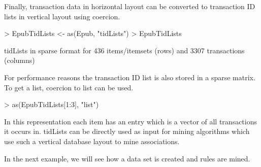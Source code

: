 \documentclass[10pt,a4paper]{article}
\newcommand{\class}[1]{\mbox{\textsf{#1}}}
\begin{document}
Finally, transaction data in horizontal layout can be converted to
transaction ID lists in vertical layout using coercion.

\begin{Schunk}
\begin{Sinput}
> EpubTidLists <- as(Epub, "tidLists")
> EpubTidLists
\end{Sinput}
\begin{Soutput}
tidLists in sparse format for
 436 items/itemsets (rows) and
 3307 transactions (columns)
\end{Soutput}
\end{Schunk}

For performance reasons the transaction ID list
is also stored in a sparse matrix. To get a list, coercion to \class{list}
can be used.

\begin{Schunk}
\begin{Sinput}
> as(EpubTidLists[1:3], "list")
\end{Sinput}
\end{Schunk}

In this representation each item has an entry
which is a vector of all transactions it occurs in.
\class{tidLists} can be directly used as input for mining algorithms which 
use such a vertical database layout to mine associations.

In the next example, we will see how a data set is created and
rules are mined.
\end{document}
